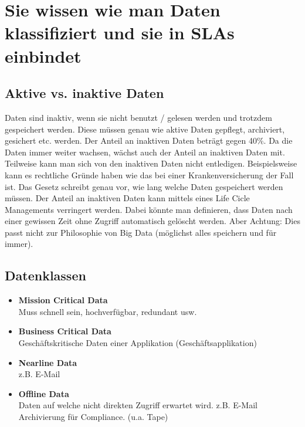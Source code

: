 \section{Sie wissen wie man Daten klassifiziert und sie in SLAs einbindet}

\subsection{Aktive vs. inaktive Daten}
Daten sind inaktiv, wenn sie nicht benutzt / gelesen werden und trotzdem gespeichert werden. Diese müssen genau wie aktive Daten gepflegt, archiviert, gesichert etc. werden.
Der Anteil an inaktiven Daten beträgt gegen 40\%. Da die Daten immer weiter wachsen, wächst auch der Anteil an inaktiven Daten mit. Teilweise kann man sich von den inaktiven Daten nicht entledigen. Beispielsweise kann es rechtliche Gründe haben wie das bei einer Krankenversicherung der Fall ist. Das Gesetz schreibt genau vor, wie lang welche Daten gespeichert werden müssen.
Der Anteil an inaktiven Daten kann mittels eines Life Cicle Managements verringert werden. Dabei könnte man definieren, dass Daten nach einer gewissen Zeit ohne Zugriff automatisch gelöscht werden. Aber Achtung: Dies passt nicht zur Philosophie von Big Data (möglichst alles speichern und für immer).

\subsection{Datenklassen}\label{sec:datenklassen}

\begin{itemize}
	\item \textbf{Mission Critical Data} \\
	Muss schnell sein, hochverfügbar, redundant usw.
	\item \textbf{Business Critical Data} \\
	Geschäftskritische Daten einer Applikation (Geschäftsapplikation)
	\item \textbf{Nearline Data} \\
	z.B. E-Mail
	\item \textbf{Offline Data} \\
	Daten auf welche nicht direkten Zugriff erwartet wird. z.B. E-Mail Archivierung für Compliance. (u.a. Tape)
\end{itemize}

